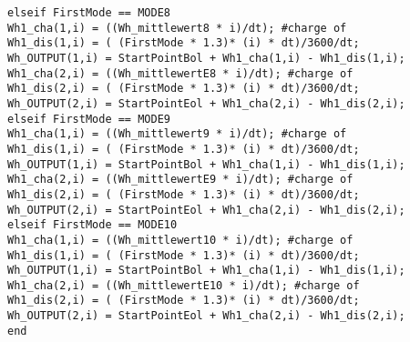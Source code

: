\begin{appendix}
\begin{lstlisting}
elseif FirstMode == MODE8
Wh1_cha(1,i) = ((Wh_mittlewert8 * i)/dt); #charge of 
Wh1_dis(1,i) = ( (FirstMode * 1.3)* (i) * dt)/3600/dt;
Wh_OUTPUT(1,i) = StartPointBol + Wh1_cha(1,i) - Wh1_dis(1,i);
Wh1_cha(2,i) = ((Wh_mittlewertE8 * i)/dt); #charge of 
Wh1_dis(2,i) = ( (FirstMode * 1.3)* (i) * dt)/3600/dt;
Wh_OUTPUT(2,i) = StartPointEol + Wh1_cha(2,i) - Wh1_dis(2,i);
elseif FirstMode == MODE9
Wh1_cha(1,i) = ((Wh_mittlewert9 * i)/dt); #charge of 
Wh1_dis(1,i) = ( (FirstMode * 1.3)* (i) * dt)/3600/dt;
Wh_OUTPUT(1,i) = StartPointBol + Wh1_cha(1,i) - Wh1_dis(1,i);
Wh1_cha(2,i) = ((Wh_mittlewertE9 * i)/dt); #charge of 
Wh1_dis(2,i) = ( (FirstMode * 1.3)* (i) * dt)/3600/dt;
Wh_OUTPUT(2,i) = StartPointEol + Wh1_cha(2,i) - Wh1_dis(2,i);
elseif FirstMode == MODE10
Wh1_cha(1,i) = ((Wh_mittlewert10 * i)/dt); #charge of 
Wh1_dis(1,i) = ( (FirstMode * 1.3)* (i) * dt)/3600/dt;
Wh_OUTPUT(1,i) = StartPointBol + Wh1_cha(1,i) - Wh1_dis(1,i);
Wh1_cha(2,i) = ((Wh_mittlewertE10 * i)/dt); #charge of 
Wh1_dis(2,i) = ( (FirstMode * 1.3)* (i) * dt)/3600/dt;
Wh_OUTPUT(2,i) = StartPointEol + Wh1_cha(2,i) - Wh1_dis(2,i);
end
\end{lstlisting}
\end{appendix}

\endinput
